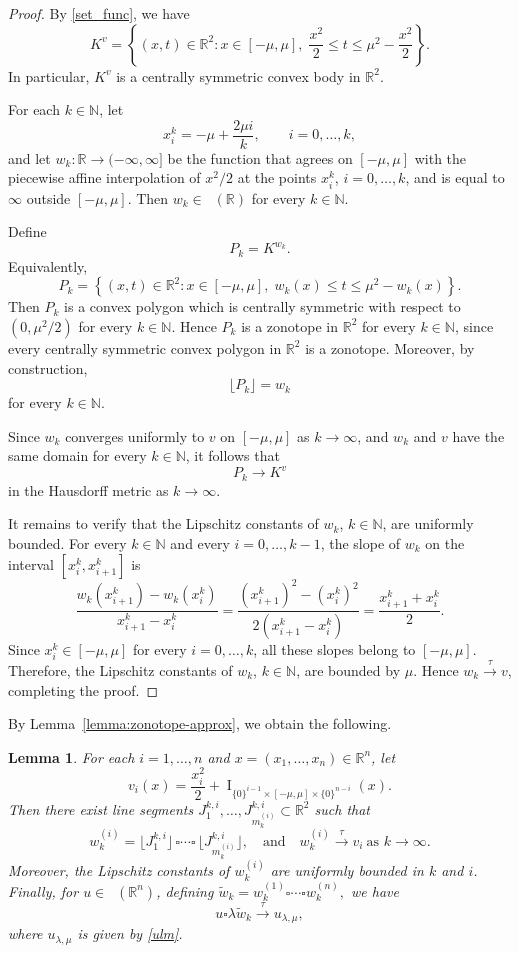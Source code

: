 \documentclass[11pt]{article}
\newtheorem{lema}[teo]{Lemma}
\theoremstyle{definition} %
\newcommand{\RR}{(\mathbb{R}^n)}
\DeclareMathOperator{\I}{I}
\DeclareMathOperator{\LP}{Conv_{lp}}
\newcommand{\seq}{\xrightarrow{\tau}}
\begin{document}
\begin{proof}
By \eqref{set_func}, we have
\[
K^v=
\left\{
(x,t)\in\mathbb{R}^2:
x\in[-\mu,\mu],\;
\frac{x^2}{2}\le t\le \mu^2-\frac{x^2}{2}
\right\}.
\]
In particular, $K^v$ is a centrally symmetric convex body in $\mathbb{R}^2$.

For each $k\in\mathbb{N}$, let
\[
x_i^k=-\mu+\frac{2\mu i}{k},
\qquad i=0,\dots,k,
\]
and let $w_k:\mathbb{R}\to(-\infty,\infty]$ be the function that agrees on
$[-\mu,\mu]$ with the piecewise affine interpolation of $x^2/2$ at the points
$x_i^k$, $i=0,\dots,k$, and is equal to $\infty$ outside
$[-\mu,\mu]$. Then $w_k\in\LP(\mathbb{R})$ for every $k\in\mathbb{N}$. 

Define
\[
P_k=K^{w_k}.
\]
Equivalently,
\[
P_k=
\left\{
(x,t)\in\mathbb{R}^2:
x\in[-\mu,\mu],\;
w_k(x)\le t\le \mu^2-w_k(x)
\right\}.
\]
Then $P_k$ is a convex polygon which is centrally symmetric with respect to
$(0,\mu^2/2)$ for every $k\in\mathbb{N}$. Hence $P_k$ is a zonotope in
$\mathbb{R}^2$ for every $k\in\mathbb{N}$, since every centrally symmetric convex polygon in $\mathbb{R}^2$ is a zonotope. Moreover, by construction,
\[
\lfloor P_k\rfloor=w_k
\]
for every $k\in\mathbb{N}$.

Since $w_k$ converges uniformly to $v$ on $[-\mu,\mu]$ as $k\to\infty$, and $w_k$ and $v$ have the same domain for every $k\in\mathbb{N}$, it follows that
\[
P_k\to K^v
\]
in the Hausdorff metric as $k\to\infty$.

It remains to verify that the Lipschitz constants of $w_k$, $k\in\mathbb{N}$, are uniformly bounded. For every $k\in\mathbb{N}$ and every $i=0,\dots,k-1$, the slope of $w_k$ on the interval $[x_i^k,x_{i+1}^k]$ is
\[
\frac{w_k(x_{i+1}^k)-w_k(x_i^k)}
{x_{i+1}^k-x_i^k}
=
\frac{(x_{i+1}^k)^2-(x_i^k)^2}
{2(x_{i+1}^k-x_i^k)}
=
\frac{x_{i+1}^k+x_i^k}{2}.
\]
Since $x_i^k\in[-\mu,\mu]$ for every $i=0,\dots,k$, all these slopes belong to
$[-\mu,\mu]$. Therefore, the Lipschitz constants of $w_k$, $k\in\mathbb{N}$, are bounded by $\mu$. Hence $w_k\seq v$, completing the proof.
\end{proof}





By Lemma~\ref{lemma:zonotope-approx}, we obtain the following.

\begin{lema}\label{1-dim}
For each $i=1,\dots,n$ and $x=(x_1,\dots,x_n)\in \mathbb{R}^n$, let
\[
v_i(x)=\frac{x_i^2}{2}+\I_{\{0\}^{i-1}\times[-\mu,\mu]\times\{0\}^{n-i}}(x).
\]
Then there exist line segments
$J_1^{k,i},\dots,J_{m_k^{(i)}}^{k,i} \subset \mathbb{R}^2$
such that
\[
w_k^{(i)} = \lfloor J_1^{k,i} \rfloor \,\square \cdots \square\, \lfloor J_{m_k^{(i)}}^{k,i} \rfloor,
\quad \text{and} \quad
w_k^{(i)} \seq v_i \ \text{as } k\to\infty.
\]
Moreover, the Lipschitz constants of $w_k^{(i)}$ are uniformly bounded in $k$ and $i$.  Finally, for $u\in \LP\RR$, defining
\(
\tilde{w}_k = w_k^{(1)} \square \cdots \square w_k^{(n)},
\)
we have
\[
u \square \lambda \tilde{w}_k \seq u_{\lambda,\mu},
\]
where $u_{\lambda,\mu}$ is given by \eqref{ulm}.
\end{lema}
\end{document}
